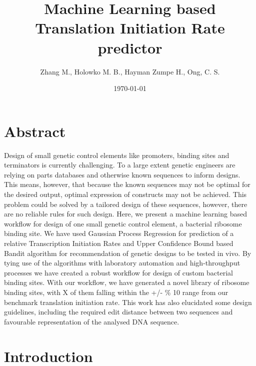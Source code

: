 \documentclass{article}
\title{Machine Learning based Translation Initiation Rate predictor}
\author{Zhang M., Holowko M. B., Hayman Zumpe H., Ong, C. S.}
\date{\today{}}
\begin{document}
\maketitle

\section{Abstract}

Design of small genetic control elements like promoters, binding sites and terminators is currently challenging.
To a large extent genetic engineers are relying on parts databases and otherwise known sequences to inform designs.
This means, however, that because the known sequences may not be optimal for the desired output, optimal expression of constructs may not be achieved.
This problem could be solved by a tailored design of these sequences, however, there are no reliable rules for such design.
Here, we present a machine learning based workflow for design of one small genetic control element, a bacterial ribosome binding site.
We have used Gaussian Process Regression for prediction of a relative Transcription Initiation Rates and Upper Confidence Bound based Bandit algorithm for recommendation of genetic designs to be tested in vivo.
By tying use of the algorithms with laboratory automation and high-throughput processes we have created a robust workflow for design of custom bacterial binding sites.
With our workflow, we have generated a novel library of ribosome binding sites, with X of them falling within the +/- \% 10 range from our benchmark translation initiation rate.
This work has also elucidated some design guidelines, including the required edit distance between two sequences and favourable representation of the analysed DNA sequence.


\section{Introduction}
\end{document}
